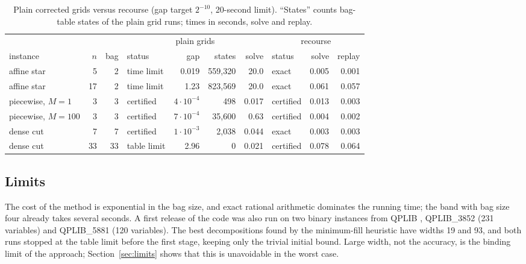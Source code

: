 \begin{table}[t]
\centering
\caption{Plain corrected grids versus recourse (gap target $2^{-10}$, 20-second
limit). ``States'' counts bag-table states of the plain grid runs; times in
seconds, solve and replay.}\label{tab:recourse}
\begin{tabular}{lrrlrrrlrr}
\toprule
&&&\multicolumn{4}{c}{plain grids}&\multicolumn{3}{c}{recourse}\\
\cmidrule(lr){4-7}\cmidrule(lr){8-10}
instance & $n$ & bag & status & gap & states & solve & status & solve & replay\\
\midrule
affine star & 5 & 2 & time limit & 0.019 & 559{,}320 & 20.0 & exact & 0.005 & 0.001\\
affine star & 17 & 2 & time limit & 1.23 & 823{,}569 & 20.0 & exact & 0.061 & 0.057\\
piecewise, $M=1$ & 3 & 3 & certified & $4\cdot10^{-4}$ & 498 & 0.017 & certified & 0.013 & 0.003\\
piecewise, $M=100$ & 3 & 3 & certified & $7\cdot10^{-4}$ & 35{,}600 & 0.63 & certified & 0.004 & 0.002\\
dense cut & 7 & 7 & certified & $1\cdot10^{-3}$ & 2{,}038 & 0.044 & exact & 0.003 & 0.003\\
dense cut & 33 & 33 & table limit & 2.96 & 0 & 0.021 & certified & 0.078 & 0.064\\
\bottomrule
\end{tabular}
\end{table}

\subsection{Limits}
The cost of the method is exponential in the bag size, and exact rational
arithmetic dominates the running time; the band with bag size four already
takes several seconds. A first release of the code was also run on two binary
instances from QPLIB \cite{FuriniEtAl2019}, QPLIB\_3852 (231 variables) and QPLIB\_5881 (120 variables).
The best decompositions found by the minimum-fill heuristic have widths 19
and 93, and both runs stopped at the table limit before the first stage,
keeping only the trivial initial bound. Large width, not the accuracy, is the
binding limit of the approach; Section~\ref{sec:limits} shows that this is
unavoidable in the worst case.
